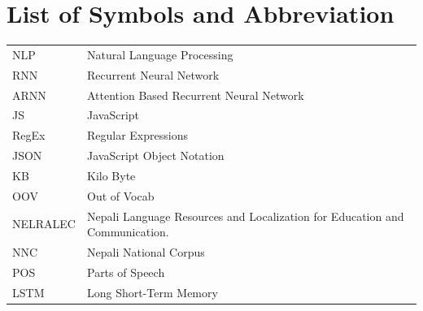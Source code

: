 				\chapter*{List of Symbols and Abbreviation}
			\endgroup
		\justify
		\normalsize
		\begin{tabular}{p{1in}p{3in}}
			NLP & Natural Language Processing\\
			RNN & Recurrent Neural Network\\
			ARNN & Attention Based Recurrent Neural Network\\
            JS & JavaScript\\
            RegEx & Regular Expressions\\
            JSON & JavaScript Object Notation\\
            KB & Kilo Byte\\
            OOV & Out of Vocab\\
            NELRALEC & Nepali Language Resources and Localization for Education and
                Communication.\\
            NNC & Nepali National Corpus\\
            POS & Parts of Speech\\
            LSTM & Long Short-Term Memory\\
		\end{tabular}
		\break
		\pagebreak
		
	